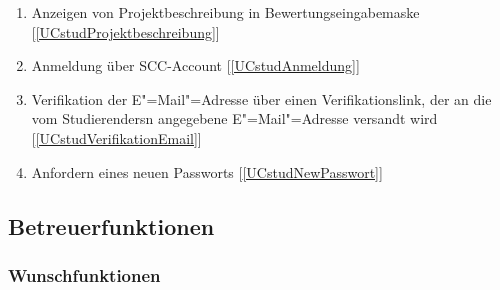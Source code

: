 \documentclass[parskip=full]{scrartcl}
\newcommand{\swtLabel}[1]{\textbf{/#1\arabic*0/}}
\newcommand{\testRef}[1]{[\ref{#1}]}
\begin{document}
\begin{enumerate}[label=\swtLabel{FA}, resume]
	\item Anzeigen von \gls{Projekt}beschreibung in \gls{Bewertung}seingabemaske
	\label{FAbeschreibung-Bewertung} \testRef{UCstudProjektbeschreibung}
	\item Anmeldung über \gls{SCC-Account} \label{FAstudUanmeldung} \testRef{UCstudAnmeldung}
	\item Verifikation der E"=Mail"=Adresse über einen Verifikationslink, der an
	die vom \glspl{Studierender}n angegebene E"=Mail"=Adresse versandt wird
	\label{FAemailverifikation} \testRef{UCstudVerifikationEmail}
	\item Anfordern eines neuen Passworts \label{FApasswortvergessen}
	\testRef{UCstudNewPasswort}
\end{enumerate}

\subsection{Betreuerfunktionen}
\subsubsection{Wunschfunktionen}
\end{document}
